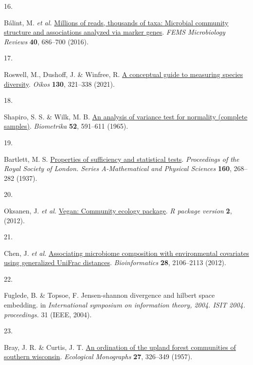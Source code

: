 \documentclass[
  10pt,
  letterpaper,
  DIV=11,
  numbers=noendperiod]{scrartcl}
\newlength{\cslhangindent}
\newlength{\csllabelwidth}
\newlength{\cslentryspacingunit} %
\newenvironment{CSLReferences}[2] %
 {%
  \setlength{\parindent}{0pt}
  \ifodd #1
  \let\oldpar\par
  \def\par{\hangindent=\cslhangindent\oldpar}
  \fi
  \setlength{\parskip}{#2\cslentryspacingunit}
 }%
 {}
\newcommand{\CSLLeftMargin}[1]{\parbox[t]{\csllabelwidth}{#1}}
\newcommand{\CSLRightInline}[1]{\parbox[t]{\linewidth - \csllabelwidth}{#1}\break}
\begin{document}
\begin{CSLReferences}{0}{0}
\leavevmode{}%
\CSLLeftMargin{16. }%
\CSLRightInline{Bálint, M. \emph{et al.}
\href{https://doi.org/10.1093/femsre/fuw017}{Millions of reads,
thousands of taxa: Microbial community structure and associations
analyzed via marker genes}. \emph{FEMS Microbiology Reviews}
\textbf{40}, 686--700 (2016).}

\leavevmode{}%
\CSLLeftMargin{17. }%
\CSLRightInline{Roswell, M., Dushoff, J. \& Winfree, R.
\href{https://doi.org/10.1111/oik.07202}{A conceptual guide to measuring
species diversity}. \emph{Oikos} \textbf{130}, 321--338 (2021).}

\leavevmode{}%
\CSLLeftMargin{18. }%
\CSLRightInline{Shapiro, S. S. \& Wilk, M. B.
\href{https://doi.org/10.2307/2333709\%20}{An analysis of variance test
for normality (complete samples)}. \emph{Biometrika} \textbf{52},
591--611 (1965).}

\leavevmode{}%
\CSLLeftMargin{19. }%
\CSLRightInline{Bartlett, M. S.
\href{https://doi.org/10.1098/rspa.1937.0109}{Properties of sufficiency
and statistical tests}. \emph{Proceedings of the Royal Society of
London. Series A-Mathematical and Physical Sciences} \textbf{160},
268--282 (1937).}

\leavevmode{}%
\CSLLeftMargin{20. }%
\CSLRightInline{Oksanen, J. \emph{et al.}
\href{https://cran.r-project.org/web/packages/vegan/index.html}{Vegan:
Community ecology package}. \emph{R package version} \textbf{2},
(2012).}

\leavevmode{}%
\CSLLeftMargin{21. }%
\CSLRightInline{Chen, J. \emph{et al.}
\href{https://doi.org/10.1093/bioinformatics/bts342}{Associating
microbiome composition with environmental covariates using generalized
UniFrac distances}. \emph{Bioinformatics} \textbf{28}, 2106--2113
(2012).}

\leavevmode{}%
\CSLLeftMargin{22. }%
\CSLRightInline{Fuglede, B. \& Topsoe, F. Jensen-shannon divergence and
hilbert space embedding. in \emph{International symposium on information
theory, 2004. ISIT 2004. proceedings.} 31 (IEEE, 2004).}

\leavevmode{}%
\CSLLeftMargin{23. }%
\CSLRightInline{Bray, J. R. \& Curtis, J. T.
\href{https://doi.org/10.2307/1942268\%20}{An ordination of the upland
forest communities of southern wisconsin}. \emph{Ecological Monographs}
\textbf{27}, 326--349 (1957).}


\end{CSLReferences}
\end{document}
